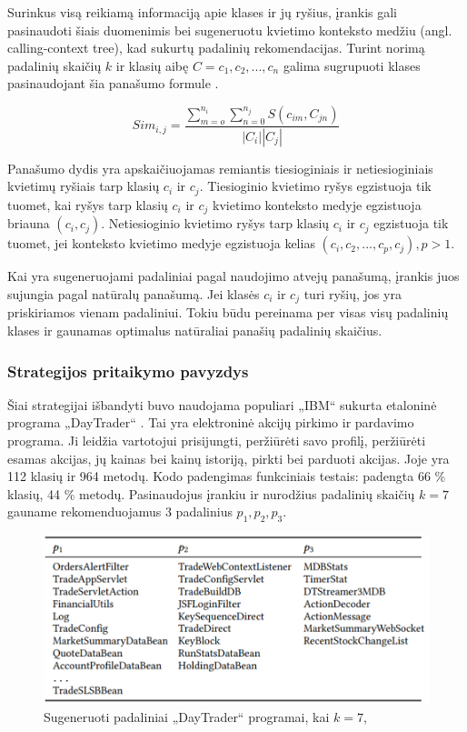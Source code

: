 \documentclass{VUMIFPSbakalaurinis}
\begin{document}
Surinkus visą reikiamą informaciją apie klases ir jų ryšius, įrankis gali pasinaudoti šiais duomenimis bei sugeneruotu kvietimo konteksto medžiu (angl. calling-context tree), kad sukurtų padalinių rekomendacijas. Turint norimą padalinių skaičių $k$ ir klasių aibę $C = {c_{1}, c_{2}, ..., c_{n}}$ galima sugrupuoti klases pasinaudojant šia panašumo formule \cite{KXL+20}.

\begin{equation}\label{eq:panasumo-formule}
    Sim_{i,j} = \frac{\sum_{m=o}^{n_{i}}\sum_{n=0}^{n_{j}}S(c_{im},C_{jn})}{\left| C_{i} \right|\left| C_{j} \right|}
\end{equation}

Panašumo dydis yra apskaičiuojamas remiantis tiesioginiais ir netiesioginiais kvietimų ryšiais tarp klasių $c_{i}$ ir $c_{j}$. Tiesioginio kvietimo ryšys egzistuoja tik tuomet, kai ryšys tarp klasių $c_{i}$ ir $c_{j}$ kvietimo konteksto medyje egzistuoja briauna $(c_{i}, c_{j})$. Netiesioginio kvietimo ryšys tarp klasių $c_{i}$ ir $c_{j}$ egzistuoja tik tuomet, jei konteksto kvietimo medyje egzistuoja kelias $(c_{i}, c_{2}, ..., c_{p}, c_{j}), p > 1$.

Kai yra sugeneruojami padaliniai pagal naudojimo atvejų panašumą, įrankis juos sujungia pagal natūralų panašumą. Jei klasės $c_{i}$ ir $c_{j}$ turi ryšių, jos yra priskiriamos vienam padaliniui. Tokiu būdu pereinama per visas visų padalinių klases ir gaunamas optimalus natūraliai panašių padalinių skaičius.

\subsubsection{Strategijos pritaikymo pavyzdys}
Šiai strategijai išbandyti buvo naudojama populiari „IBM“ sukurta etaloninė programa „DayTrader“ \cite{IBM15}. Tai yra elektroninė akcijų pirkimo ir pardavimo programa. Ji leidžia vartotojui prisijungti, peržiūrėti savo profilį, peržiūrėti esamas akcijas, jų kainas bei kainų istoriją, pirkti bei parduoti akcijas. Joje yra 112 klasių ir 964 metodų. Kodo padengimas funkciniais testais: padengta  66 \% klasių, 44 \% metodų. Pasinaudojus įrankiu ir nurodžius padalinių skaičių $k = 7$ gauname rekomenduojamus 3 padalinius $p_{1}, p_{2}, p_{3}$.

\begin{figure}[H]
    \centering
    \includegraphics{img/mono-micro-padaliniai.png}
    \caption{Sugeneruoti padaliniai „DayTrader“ programai, kai $k = 7$, \cite{KXK+21}}
    \label{img:mono-micro-padaliniai}
\end{figure}
\end{document}
